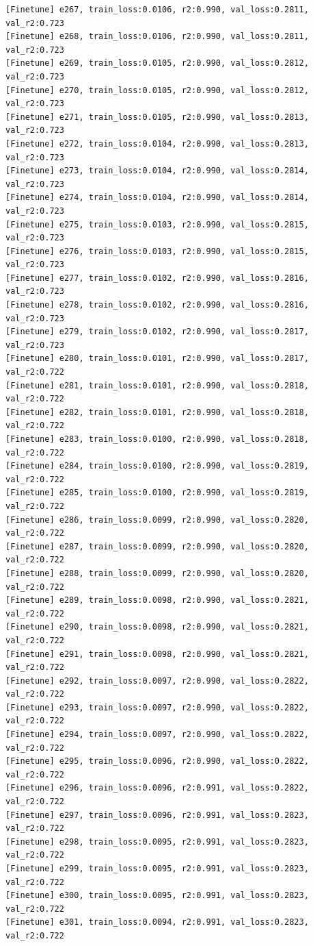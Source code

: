 \documentclass[a4paper, 12pt]{article}
\begin{document}
\begin{lstlisting}
[Finetune] e267, train_loss:0.0106, r2:0.990, val_loss:0.2811, val_r2:0.723
[Finetune] e268, train_loss:0.0106, r2:0.990, val_loss:0.2811, val_r2:0.723
[Finetune] e269, train_loss:0.0105, r2:0.990, val_loss:0.2812, val_r2:0.723
[Finetune] e270, train_loss:0.0105, r2:0.990, val_loss:0.2812, val_r2:0.723
[Finetune] e271, train_loss:0.0105, r2:0.990, val_loss:0.2813, val_r2:0.723
[Finetune] e272, train_loss:0.0104, r2:0.990, val_loss:0.2813, val_r2:0.723
[Finetune] e273, train_loss:0.0104, r2:0.990, val_loss:0.2814, val_r2:0.723
[Finetune] e274, train_loss:0.0104, r2:0.990, val_loss:0.2814, val_r2:0.723
[Finetune] e275, train_loss:0.0103, r2:0.990, val_loss:0.2815, val_r2:0.723
[Finetune] e276, train_loss:0.0103, r2:0.990, val_loss:0.2815, val_r2:0.723
[Finetune] e277, train_loss:0.0102, r2:0.990, val_loss:0.2816, val_r2:0.723
[Finetune] e278, train_loss:0.0102, r2:0.990, val_loss:0.2816, val_r2:0.723
[Finetune] e279, train_loss:0.0102, r2:0.990, val_loss:0.2817, val_r2:0.723
[Finetune] e280, train_loss:0.0101, r2:0.990, val_loss:0.2817, val_r2:0.722
[Finetune] e281, train_loss:0.0101, r2:0.990, val_loss:0.2818, val_r2:0.722
[Finetune] e282, train_loss:0.0101, r2:0.990, val_loss:0.2818, val_r2:0.722
[Finetune] e283, train_loss:0.0100, r2:0.990, val_loss:0.2818, val_r2:0.722
[Finetune] e284, train_loss:0.0100, r2:0.990, val_loss:0.2819, val_r2:0.722
[Finetune] e285, train_loss:0.0100, r2:0.990, val_loss:0.2819, val_r2:0.722
[Finetune] e286, train_loss:0.0099, r2:0.990, val_loss:0.2820, val_r2:0.722
[Finetune] e287, train_loss:0.0099, r2:0.990, val_loss:0.2820, val_r2:0.722
[Finetune] e288, train_loss:0.0099, r2:0.990, val_loss:0.2820, val_r2:0.722
[Finetune] e289, train_loss:0.0098, r2:0.990, val_loss:0.2821, val_r2:0.722
[Finetune] e290, train_loss:0.0098, r2:0.990, val_loss:0.2821, val_r2:0.722
[Finetune] e291, train_loss:0.0098, r2:0.990, val_loss:0.2821, val_r2:0.722
[Finetune] e292, train_loss:0.0097, r2:0.990, val_loss:0.2822, val_r2:0.722
[Finetune] e293, train_loss:0.0097, r2:0.990, val_loss:0.2822, val_r2:0.722
[Finetune] e294, train_loss:0.0097, r2:0.990, val_loss:0.2822, val_r2:0.722
[Finetune] e295, train_loss:0.0096, r2:0.990, val_loss:0.2822, val_r2:0.722
[Finetune] e296, train_loss:0.0096, r2:0.991, val_loss:0.2822, val_r2:0.722
[Finetune] e297, train_loss:0.0096, r2:0.991, val_loss:0.2823, val_r2:0.722
[Finetune] e298, train_loss:0.0095, r2:0.991, val_loss:0.2823, val_r2:0.722
[Finetune] e299, train_loss:0.0095, r2:0.991, val_loss:0.2823, val_r2:0.722
[Finetune] e300, train_loss:0.0095, r2:0.991, val_loss:0.2823, val_r2:0.722
[Finetune] e301, train_loss:0.0094, r2:0.991, val_loss:0.2823, val_r2:0.722

\end{lstlisting}
\end{document}
